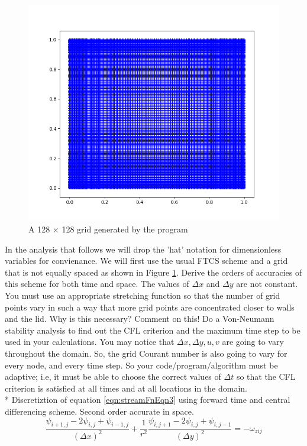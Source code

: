 \documentclass{article}
\begin{document}
\begin{figure}[h!]
\centering
\includegraphics[scale=.5]{Figure_1.png}
\caption{A 128 $\times$ 128 grid generated by the program}
\label{fig:gridImage}
\end{figure}
In the analysis that follows we will drop the 'hat' notation for dimensionless variables for convienance. We will first use the usual FTCS scheme and a grid that is not equally spaced as shown in Figure \ref{fig:gridImage}. Derive the orders of accuracies of this scheme for both time and space. The values of $\Delta x$ and $\Delta y$ are not constant. You must use an appropriate stretching function so that the number of grid points vary in such a way that more grid points are concentrated closer to walls and the lid. Why is this necessary? Comment on this! Do a Von-Neumann stability analysis to find out the CFL criterion and the maximum time step to be used in your calculations. You may notice that $\Delta x,\Delta y,u,v$ are going to vary throughout the domain. So, the grid Courant number is also going to vary for every node, and every time step. So your code/program/algorithm must be adaptive; i.e, it must be able to choose the correct values of $\Delta t$ so that the CFL criterion is satisfied at all times and at all locations in the domain.
\\*
Discretiztion of equation \ref{eqn:streamFnEqn3} using forward time and central differencing scheme. Second order accurate in space.
\begin{equation}
\frac{\psi_{i+1,j}-2\psi_{i,j}+\psi_{i-1,j} }{(\Delta x)^2} + \frac{1}{r^2}\frac{\psi_{i,j+1}-2\psi_{i,j}+\psi_{i,j-1}}{(\Delta y)^2} = -\omega_{zij}
\end{equation}
\end{document}
